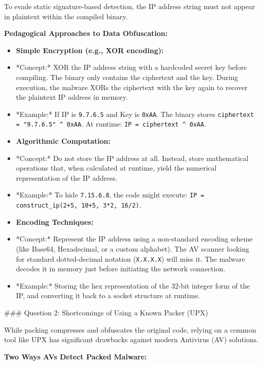 \documentclass{article}
\begin{document}
To evade static signature-based detection, the IP address string must not appear in plaintext within the compiled binary.

\textbf{Pedagogical Approaches to Data Obfuscation:}

\begin{itemize}
    \item[\textbf{1.}] \textbf{Simple Encryption (e.g., XOR encoding):}
    \item *Concept:* XOR the IP address string with a hardcoded secret key before compiling. The binary only contains the ciphertext and the key. During execution, the malware XORs the ciphertext with the key again to recover the plaintext IP address in memory.
    \item *Example:* If IP is \texttt{9.7.6.5} and Key is \texttt{0xAA}. The binary stores \texttt{ciphertext = "9.7.6.5" \textasciicircum{} 0xAA}. At runtime: \texttt{IP = ciphertext \textasciicircum{} 0xAA}.
    \item[\textbf{2.}] \textbf{Algorithmic Computation:}
    \item *Concept:* Do not store the IP address at all. Instead, store mathematical operations that, when calculated at runtime, yield the numerical representation of the IP address.
    \item *Example:* To hide \texttt{7.15.6.8}, the code might execute: \texttt{IP = construct\_ip(2+5, 10+5, 3*2, 16/2)}.
    \item[\textbf{3.}] \textbf{Encoding Techniques:}
    \item *Concept:* Represent the IP address using a non-standard encoding scheme (like Base64, Hexadecimal, or a custom alphabet). The AV scanner looking for standard dotted-decimal notation (\texttt{X.X.X.X}) will miss it. The malware decodes it in memory just before initiating the network connection.
    \item *Example:* Storing the hex representation of the 32-bit integer form of the IP, and converting it back to a socket structure at runtime.

\end{itemize}
\#\#\# Question 2: Shortcomings of Using a Known Packer (UPX)

While packing compresses and obfuscates the original code, relying on a common tool like UPX has significant drawbacks against modern Antivirus (AV) solutions.

\textbf{Two Ways AVs Detect Packed Malware:}
\end{document}
